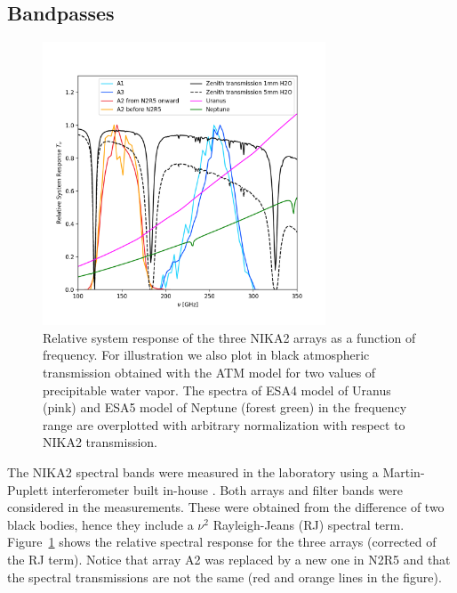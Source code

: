 


\subsection{Bandpasses}%
\label{se:bandpasses}

\begin{figure}[ht!] %
\begin{center}
\includegraphics[clip,trim={0, 1cm, 0, 2cm},width=0.75\textwidth]{Figures/SpectralBands/bandpasses_nika2_colorsok.png}
\caption[NIKA2 transmission]{Relative system response of the three NIKA2 arrays as a
  function of frequency. For illustration we also plot in black atmospheric transmission obtained with the ATM model \cite{ATM, Pardo2002} for two values of precipitable water vapor. The spectra of ESA4 model of Uranus (pink) and ESA5 model of Neptune \cite{ESAmodel} (forest green) in the frequency range are overplotted with arbitrary normalization with respect to NIKA2 transmission.} 
 \label{spectralband1}
\end{center}
\end{figure}

 

The NIKA2 spectral bands were measured in the laboratory using a
Martin-Puplett interferometer built in-house \cite{durand}.  Both
arrays and filter bands were considered in the measurements. These
were obtained from the difference of two black bodies, hence they
include a $\nu^2$ Rayleigh-Jeans (RJ) spectral term.
Figure~\ref{spectralband1} shows the relative spectral response for
the three arrays (corrected of the RJ term).  Notice that array A2 was
replaced by a new one in N2R5 and that the spectral transmissions are
not the same (red and orange lines in the figure).

